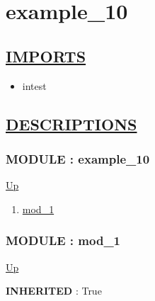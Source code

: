 \chapter*{example\_10}
\hypertarget{ecldoc:toc:example_10}{}

\section*{\underline{IMPORTS}}
\begin{itemize}
\item intest
\end{itemize}

\section*{\underline{DESCRIPTIONS}}
\subsection*{MODULE : example\_10}
\hypertarget{ecldoc:example_10}{}
\par
\begin{minipage}[t]{\textwidth}
\begin{flushleft}
  
\end{flushleft}
\end{minipage}
\hyperlink{ecldoc:toc:root}{Up} \\
\par
\par
\begin{enumerate}
\item \hyperlink{ecldoc:intest.Example_3.mod_1}{mod\_1}
\end{enumerate}
\subsection*{MODULE : mod\_1}
\hypertarget{ecldoc:intest.Example_3.mod_1}{}
\par
\begin{minipage}[t]{\textwidth}
\begin{flushleft}
  
\end{flushleft}
\end{minipage}
\hyperlink{ecldoc:example_10}{Up} \\
\par
\par
\textbf{INHERITED} : True \\


